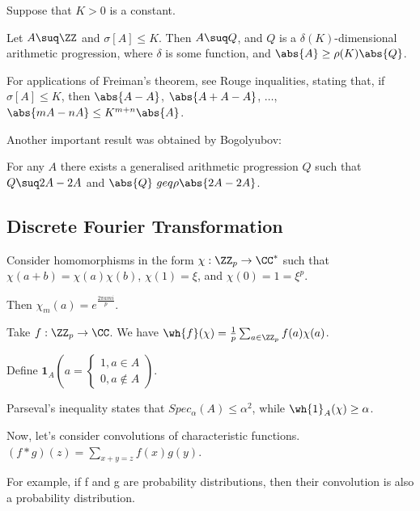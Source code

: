 \documentclass[11pt]{scrartcl}
\begin{document}
  \begin{theorem}
    Suppose that $K>0$ is a constant.

    Let $A\suq \ZZ$ and $\sigma[A] \leq K$. Then $A\suq Q$, and $Q$ is
    a $\delta(K)$-dimensional arithmetic progression, where $\delta$
    is some function, and $\abs{A} \geq \rho(K) \abs{Q}$.
  \end{theorem}

  For applications of Freiman's theorem, see Rouge inqualities,
  stating that, if $\sigma[A] \leq K$, then $\abs{A-A}$,
  $\abs{A+A - A}$, $\dots$, $\abs{mA-nA} \leq K^{m+n}\abs{A}$.

  Another important result was obtained by Bogolyubov:

  \begin{lemma}
    For any $A$ there exists a generalised arithmetic progression $Q$
    such that $Q\suq 2A - 2A$ and $\abs{Q} \ geq \rho \abs{2A-2A}$.
  \end{lemma}

  \subsection{Discrete Fourier Transformation}

  Consider homomorphisms in the form $\chi: \ZZ_{p} \to \CC^{*}$ such
  that $\chi(a+b) = \chi(a)\chi(b)$, $\chi(1) = \xi$, and
  $\chi(0) = 1 = \xi^{p}$.

  Then $\chi_{m}(a) = e^{\frac{2 \pi ami}{p}}$.

  Take $f:\ZZ_{p} \to \CC$. We have
  $\wh{f}(\chi) = \frac{1}{p} \sum_{a\in \ZZ_{p}} f(a)\chi(a)$.

  Define $\mathbf{1}_{A}(a = \begin{cases}
    1, a\in A\\
    0, a\not\in A
  \end{cases})$.

  Parseval's inequality states that
  $Spec_{\alpha}(A) \leq \alpha^{2}$, while
  $\wh{1}_{A}(\chi) \geq \alpha$.

  Now, let's consider convolutions of characteristic functions.
  $(f * g)(z) = \sum_{x+y = z} f(x)g(y) $.

  For example, if f and g are probability distributions, then their convolution is also a probability distribution.
\end{document}
